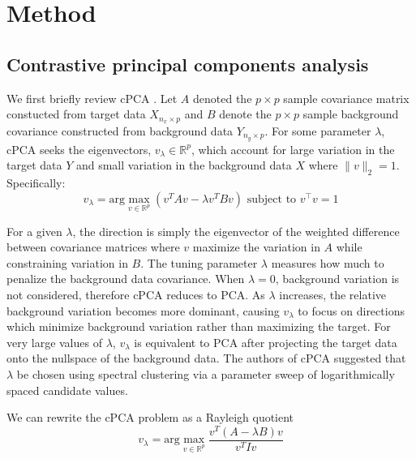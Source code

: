 \documentclass[12pt]{article}
\begin{document}

\section{Method}


\subsection{Contrastive principal components analysis}
We first briefly review cPCA \cite{Abid}. Let $A$ denoted the $p\times p$ sample covariance matrix constucted from target data $X_{n_x \times p}$ and $B$ denote the $p\times p$ sample background covariance constructed from background data $Y_{n_y \times p}$. For some parameter $\lambda$, cPCA seeks the eigenvectors, $v_\lambda \in \mathbb{R}^p$, which account for large variation in the target data $Y$ and small variation in the background data $X$ where $\|v\|_2 = 1$. Specifically:  
\[v_\lambda = \text{arg}\max_{v \in \mathbb{R}^p}{\left(v^TAv - \lambda v^TBv\right)} \mbox{ subject to } v^\top  v = 1 \]

For a given $\lambda$, the direction is simply the eigenvector of the weighted difference between covariance matrices where $v$ maximize the variation in $A$ while constraining variation in $B$.
The tuning parameter $\lambda$ measures how much to penalize the background data covariance. When $\lambda = 0$, background variation is not considered, therefore cPCA reduces to PCA. As $\lambda$ increases, the relative background variation becomes more dominant, causing $v_\lambda$ to focus on directions which minimize background variation rather than maximizing the target. For very large values of $\lambda$, $v_\lambda$ is equivalent to PCA after projecting the target data onto the nullspace of the background data.  The authors of cPCA suggested that $\lambda$ be chosen using spectral clustering via a parameter sweep of logarithmically spaced candidate values.

We can rewrite the cPCA problem as a Rayleigh quotient
\[v_\lambda = \text{arg}\max_{v \in \mathbb{R}^p}{\frac{v^T\left(A - \lambda B\right)v}{v^T I v}}\]
\end{document}
